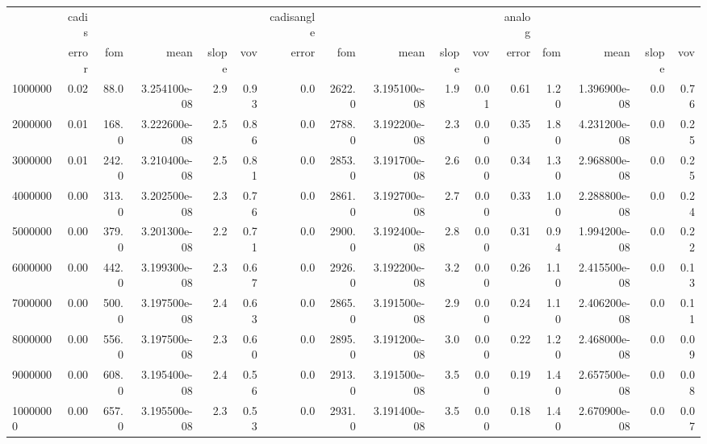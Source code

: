 \begin{tabular}{lrrrrrrrrrrrrrrr}
\toprule
{} & cadis &       &               &       &      & cadisangle &        &               &       &      & analog &      &               &       &      \\
{} & error &   fom &          mean & slope &  vov &      error &    fom &          mean & slope &  vov &  error &  fom &          mean & slope &  vov \\
\midrule
1000000  &  0.02 &  88.0 &  3.254100e-08 &   2.9 & 0.93 &        0.0 & 2622.0 &  3.195100e-08 &   1.9 & 0.01 &   0.61 & 1.20 &  1.396900e-08 &   0.0 & 0.76 \\
2000000  &  0.01 & 168.0 &  3.222600e-08 &   2.5 & 0.86 &        0.0 & 2788.0 &  3.192200e-08 &   2.3 & 0.00 &   0.35 & 1.80 &  4.231200e-08 &   0.0 & 0.25 \\
3000000  &  0.01 & 242.0 &  3.210400e-08 &   2.5 & 0.81 &        0.0 & 2853.0 &  3.191700e-08 &   2.6 & 0.00 &   0.34 & 1.30 &  2.968800e-08 &   0.0 & 0.25 \\
4000000  &  0.00 & 313.0 &  3.202500e-08 &   2.3 & 0.76 &        0.0 & 2861.0 &  3.192700e-08 &   2.7 & 0.00 &   0.33 & 1.00 &  2.288800e-08 &   0.0 & 0.24 \\
5000000  &  0.00 & 379.0 &  3.201300e-08 &   2.2 & 0.71 &        0.0 & 2900.0 &  3.192400e-08 &   2.8 & 0.00 &   0.31 & 0.94 &  1.994200e-08 &   0.0 & 0.22 \\
6000000  &  0.00 & 442.0 &  3.199300e-08 &   2.3 & 0.67 &        0.0 & 2926.0 &  3.192200e-08 &   3.2 & 0.00 &   0.26 & 1.10 &  2.415500e-08 &   0.0 & 0.13 \\
7000000  &  0.00 & 500.0 &  3.197500e-08 &   2.4 & 0.63 &        0.0 & 2865.0 &  3.191500e-08 &   2.9 & 0.00 &   0.24 & 1.10 &  2.406200e-08 &   0.0 & 0.11 \\
8000000  &  0.00 & 556.0 &  3.197500e-08 &   2.3 & 0.60 &        0.0 & 2895.0 &  3.191200e-08 &   3.0 & 0.00 &   0.22 & 1.20 &  2.468000e-08 &   0.0 & 0.09 \\
9000000  &  0.00 & 608.0 &  3.195400e-08 &   2.4 & 0.56 &        0.0 & 2913.0 &  3.191500e-08 &   3.5 & 0.00 &   0.19 & 1.40 &  2.657500e-08 &   0.0 & 0.08 \\
10000000 &  0.00 & 657.0 &  3.195500e-08 &   2.3 & 0.53 &        0.0 & 2931.0 &  3.191400e-08 &   3.5 & 0.00 &   0.18 & 1.40 &  2.670900e-08 &   0.0 & 0.07 \\
\bottomrule
\end{tabular}
